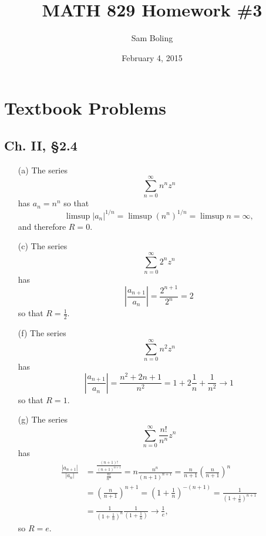 \documentclass{article}
\title{MATH 829 Homework \#3}
\date{February 4, 2015}
\author{Sam Boling}
\newcounter{Problem}
\begin{document}
\begin{titlepage}
\maketitle
\end{titlepage}

\section{Textbook Problems}

\subsection*{Ch. II, \S 2.4}
\begin{itemize}
  \item[(a)]{
    The series
    $$
    \sum_{n=0}^\infty n^n z^n
    $$
    has $a_n = n^n$ so that
    $$
      \limsup |a_n|^{1 / n}
    = \limsup (n^n)^{1 / n}
    = \limsup n = \infty,
    $$
    and therefore $R = 0$.
  }
  \item[(c)]{
    The series
    $$
    \sum_{n=0}^\infty 2^n z^n
    $$
    has
    $$
      \left|\frac{a_{n+1}}{a_n}\right|
    = \frac{2^{n+1}}{2^n}
    = 2
    $$
    so that $R = \frac{1}{2}$.
  }
  \item[(f)]{
    The series
    $$
    \sum_{n=0}^\infty n^2 z^n
    $$
    has
    $$
      \left|\frac{a_{n+1}}{a_n}\right|
    = \frac{n^2 + 2n + 1}{n^2}
    = 1 + 2\frac{1}{n} + \frac{1}{n^2} \to 1
    $$
    so that $R = 1$.
  }
  \item[(g)]{
    The series
    $$
    \sum_{n=0}^\infty \frac{n!}{n^n} z^n
    $$
    has
    \begin{align*}
      \frac{|a_{n+1}|}{|a_n|}
    &= \frac{\frac{(n+1)!}{(n+1)^{n+1}}}
            {\frac{n!}{n^n}}
     = n\frac{n^n}{(n+1)^{n+1}}
     = \frac{n}{n+1} \left(\frac{n}{n+1}\right)^n \\
    &= \left(\frac{n}{n+1}\right)^{n+1}
     = \left(1 + \frac{1}{n}\right)^{-(n+1)}
     = \frac{1}{\left(1 + \frac{1}{n}\right)^{n+1}} \\
    &= \frac{1}{\left(1 + \frac{1}{n}\right)^n}
       \frac{1}{\left(1 + \frac{1}{n}\right)}
     \to \frac{1}{e},
    \end{align*}
    so $R = e$.
  }
\end{itemize}
\end{document}
